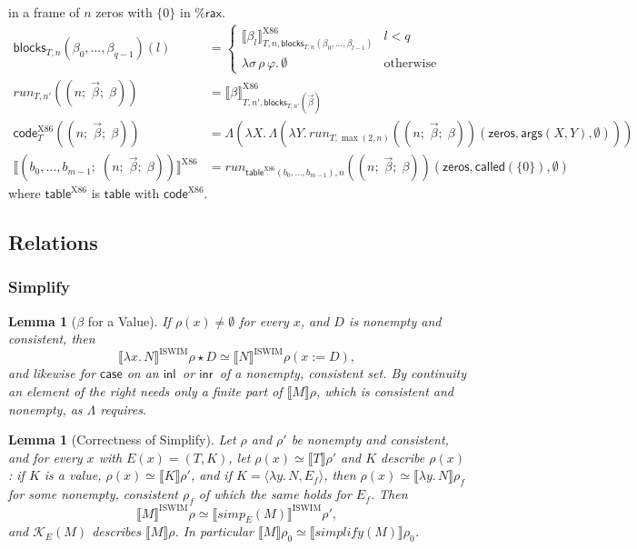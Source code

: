 \documentclass[10pt]{article}
\theoremstyle{acmplain}
\newtheorem{lemma}[theorem]{Lemma}
\newcommand{\SEM}[1]{\llbracket #1 \rrbracket}
\newcommand{\key}[1]{\mathsf{#1}}
\newcommand{\pass}[1]{\mathit{#1}}
\newcommand{\lam}[1]{\lambda #1.\,}
\newcommand{\inl}{\key{inl}\,}
\newcommand{\inr}{\key{inr}\,}
\newcommand{\ext}[3]{#1(#2{:=}#3)}
\newcommand{\NE}{\neq\emptyset}
\newcommand{\rax}{\%\key{rax}}
\begin{document}
in a frame of $n$ zeros with $\{0\}$ in $\rax$.
\begin{align*}
  \key{blocks}_{T,n}(\beta_0, \ldots, \beta_{q-1})(l) &=
    \begin{cases}
      \SEM{\beta_l}^{\mathrm{X86}}_{T,n,\key{blocks}_{T,n}(\beta_0, \ldots, \beta_{l-1})} & l < q \\
      \lambda \sigma\, \rho\, \varphi.\, \emptyset & \text{otherwise}
    \end{cases} \\
  \mathit{run}_{T,n'}((n;\; \vec{\beta};\; \beta)) &= \SEM{\beta}^{\mathrm{X86}}_{T,n',\key{blocks}_{T,n'}(\vec{\beta})} \\[1ex]
  \key{code}^{\mathrm{X86}}_T((n;\; \vec{\beta};\; \beta)) &=
    \Lambda(\lambda X.\, \Lambda(\lambda Y.\, \mathit{run}_{T,\max(2,n)}((n;\; \vec{\beta};\; \beta))(\key{zeros}, \key{args}(X, Y), \emptyset))) \\
  \SEM{(b_0, \ldots, b_{m-1};\; (n;\; \vec{\beta};\; \beta))}^{\mathrm{X86}} &=
    \mathit{run}_{\key{table}^{\mathrm{X86}}(b_0,\ldots,b_{m-1}),n}((n;\; \vec{\beta};\; \beta))(\key{zeros}, \key{called}(\{0\}), \emptyset)
\end{align*}
where $\key{table}^{\mathrm{X86}}$ is $\key{table}$ with $\key{code}^{\mathrm{X86}}$.

\subsection{Relations}

\subsubsection{Simplify}

\begin{lemma}[$\beta$ for a Value]\label{lem:beta-value}
If $\rho(x) \NE$ for every $x$, and $D$ is nonempty and consistent, then
\[
  \SEM{\lam{x} N}^{\mathrm{ISWIM}}\rho \star D \simeq \SEM{N}^{\mathrm{ISWIM}}\ext{\rho}{x}{D} ,
\]
and likewise for $\key{case}$ on an $\inl$ or $\inr$ of a nonempty, consistent set. By
continuity an element of the right needs only a finite part of $\SEM{M}\rho$,
which is consistent and nonempty, as $\Lambda$ requires.
\end{lemma}

\begin{lemma}[Correctness of Simplify]\label{lem:simplify}
Let $\rho$ and $\rho'$ be nonempty and consistent, and for every $x$ with $E(x) = (T, K)$, let
$\rho(x) \simeq \SEM{T}\rho'$ and $K$ describe $\rho(x)$: if $K$ is a value,
$\rho(x) \simeq \SEM{K}\rho'$, and if $K = \langle \lam{y} N, E_f \rangle$, then
$\rho(x) \simeq \SEM{\lam{y} N}\rho_f$ for some nonempty, consistent $\rho_f$ of
which the same holds for $E_f$. Then
\[
  \SEM{M}^{\mathrm{ISWIM}}\rho \simeq \SEM{\pass{simp}_E(M)}^{\mathrm{ISWIM}}\rho' ,
\]
and $\mathcal{K}_E(M)$ describes $\SEM{M}\rho$. In particular
$\SEM{M}\rho_0 \simeq \SEM{\pass{simplify}(M)}\rho_0$.
\end{lemma}
\end{document}
